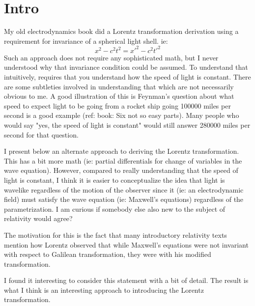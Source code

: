 %
%
%
%
\label{chap:PJLorentzWave}
\section{Intro}
My old electrodynamics book did a Lorentz transformation derivation using a requirement for invariance of a spherical light shell.  ie:
\begin{equation}\label{eqn:lorentz:20}
x^2 - c^2 t^2 = {x'}^2 - c^2 {t'}^2
\end{equation}
%
Such an approach does not require any sophisticated math, but I never understood why that invariance condition could be assumed.
To understand that intuitively, requires that you understand how the speed of light is constant.  There are some subtleties
involved in understanding that which are not necessarily obvious to me.  A good illustration of this is Feynman's question
about what speed to expect light to be
going from a rocket ship going 100000 miles per second is a good example (ref: book: Six not so easy parts).
Many people who would say "yes, the speed of light is constant" would still answer 280000 miles per second for that question.

I present below an alternate approach to deriving the Lorentz transformation.  This has a bit more math (ie: partial differentials for
change of variables in the wave equation).  However, compared to really understanding that the speed of light is constant,
I think it is easier to conceptualize the idea that light is wavelike regardless of the motion of the observer since it (ie: an electrodynamic field)
must satisfy the wave equation (ie: Maxwell's equations) regardless of the parametrization.  I am curious if somebody
else also new to the subject of relativity would agree?

The motivation for this is the fact that many introductory relativity texts mention how Lorentz observed that
while Maxwell's equations were not invariant with respect to Galilean
transformation, they were with his modified transformation.

I found it interesting to consider this statement with a bit of detail.  The result is what I think is an interesting approach
to introducing the Lorentz transformation.

